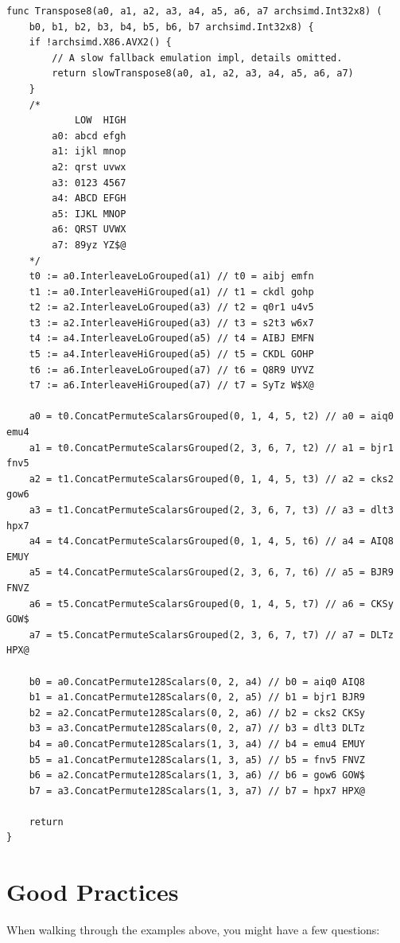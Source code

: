 \documentclass[11pt,a4paper]{article}
\begin{document}
\begin{verbatim}
func Transpose8(a0, a1, a2, a3, a4, a5, a6, a7 archsimd.Int32x8) (
    b0, b1, b2, b3, b4, b5, b6, b7 archsimd.Int32x8) {
    if !archsimd.X86.AVX2() {
        // A slow fallback emulation impl, details omitted.
        return slowTranspose8(a0, a1, a2, a3, a4, a5, a6, a7)
    }
    /*
            LOW  HIGH
        a0: abcd efgh
        a1: ijkl mnop
        a2: qrst uvwx
        a3: 0123 4567
        a4: ABCD EFGH
        a5: IJKL MNOP
        a6: QRST UVWX
        a7: 89yz YZ$@
    */
    t0 := a0.InterleaveLoGrouped(a1) // t0 = aibj emfn
    t1 := a0.InterleaveHiGrouped(a1) // t1 = ckdl gohp
    t2 := a2.InterleaveLoGrouped(a3) // t2 = q0r1 u4v5
    t3 := a2.InterleaveHiGrouped(a3) // t3 = s2t3 w6x7
    t4 := a4.InterleaveLoGrouped(a5) // t4 = AIBJ EMFN
    t5 := a4.InterleaveHiGrouped(a5) // t5 = CKDL GOHP
    t6 := a6.InterleaveLoGrouped(a7) // t6 = Q8R9 UYVZ
    t7 := a6.InterleaveHiGrouped(a7) // t7 = SyTz W$X@

    a0 = t0.ConcatPermuteScalarsGrouped(0, 1, 4, 5, t2) // a0 = aiq0 emu4
    a1 = t0.ConcatPermuteScalarsGrouped(2, 3, 6, 7, t2) // a1 = bjr1 fnv5
    a2 = t1.ConcatPermuteScalarsGrouped(0, 1, 4, 5, t3) // a2 = cks2 gow6
    a3 = t1.ConcatPermuteScalarsGrouped(2, 3, 6, 7, t3) // a3 = dlt3 hpx7
    a4 = t4.ConcatPermuteScalarsGrouped(0, 1, 4, 5, t6) // a4 = AIQ8 EMUY
    a5 = t4.ConcatPermuteScalarsGrouped(2, 3, 6, 7, t6) // a5 = BJR9 FNVZ
    a6 = t5.ConcatPermuteScalarsGrouped(0, 1, 4, 5, t7) // a6 = CKSy GOW$
    a7 = t5.ConcatPermuteScalarsGrouped(2, 3, 6, 7, t7) // a7 = DLTz HPX@

    b0 = a0.ConcatPermute128Scalars(0, 2, a4) // b0 = aiq0 AIQ8
    b1 = a1.ConcatPermute128Scalars(0, 2, a5) // b1 = bjr1 BJR9
    b2 = a2.ConcatPermute128Scalars(0, 2, a6) // b2 = cks2 CKSy
    b3 = a3.ConcatPermute128Scalars(0, 2, a7) // b3 = dlt3 DLTz
    b4 = a0.ConcatPermute128Scalars(1, 3, a4) // b4 = emu4 EMUY
    b5 = a1.ConcatPermute128Scalars(1, 3, a5) // b5 = fnv5 FNVZ
    b6 = a2.ConcatPermute128Scalars(1, 3, a6) // b6 = gow6 GOW$
    b7 = a3.ConcatPermute128Scalars(1, 3, a7) // b7 = hpx7 HPX@

    return
}
\end{verbatim}

\section{Good Practices}

When walking through the examples above, you might have a few questions:
\end{document}

